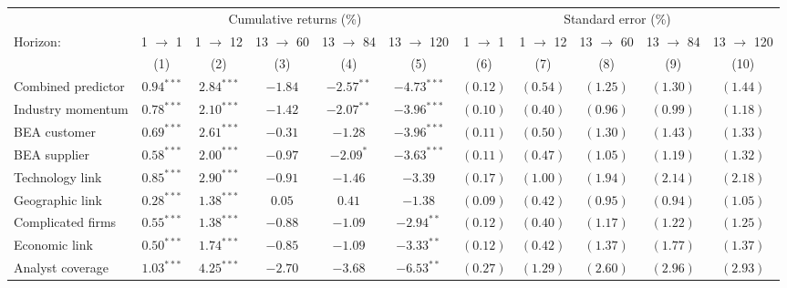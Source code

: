 \documentclass[
]{article}
\begin{document}
\begin{tabular}{lcccccccccc}
   \toprule & \multicolumn{5}{c}{Cumulative returns (\%)} & \multicolumn{5}{c}{Standard error (\%)} \\
 \cmidrule(l){2-6} \cmidrule(l){7-11}Horizon: & 1 $\rightarrow$ 1 & 1 $\rightarrow$ 12 & 13 $\rightarrow$ 60 & 13 $\rightarrow$ 84 & 13 $\rightarrow$ 120 & 1 $\rightarrow$ 1 & 1 $\rightarrow$ 12 & 13 $\rightarrow$ 60 & 13 $\rightarrow$ 84 & 13 $\rightarrow$ 120 \\ 
   \cmidrule(l){2-6} \cmidrule(l){7-11} \vspace{5pt} & (1) & (2) & (3) & (4) & (5) & (6) & (7) & (8) & (9) & (10) \\ 
   \vspace{5pt}Combined predictor & $0.94^{***}$ & $2.84^{***}$ & $-1.84$ & $-2.57^{**}$ & $-4.73^{***}$ & $(0.12)$ & $(0.54)$ & $(1.25)$ & $(1.30)$ & $(1.44)$ \\ 
  Industry momentum & $0.78^{***}$ & $2.10^{***}$ & $-1.42$ & $-2.07^{**}$ & $-3.96^{***}$ & $(0.10)$ & $(0.40)$ & $(0.96)$ & $(0.99)$ & $(1.18)$ \\ 
  BEA customer & $0.69^{***}$ & $2.61^{***}$ & $-0.31$ & $-1.28$ & $-3.96^{***}$ & $(0.11)$ & $(0.50)$ & $(1.30)$ & $(1.43)$ & $(1.33)$ \\ 
  BEA supplier & $0.58^{***}$ & $2.00^{***}$ & $-0.97$ & $-2.09^{*}$ & $-3.63^{***}$ & $(0.11)$ & $(0.47)$ & $(1.05)$ & $(1.19)$ & $(1.32)$ \\ 
  Technology link & $0.85^{***}$ & $2.90^{***}$ & $-0.91$ & $-1.46$ & $-3.39$ & $(0.17)$ & $(1.00)$ & $(1.94)$ & $(2.14)$ & $(2.18)$ \\ 
  Geographic link & $0.28^{***}$ & $1.38^{***}$ & $0.05$ & $0.41$ & $-1.38$ & $(0.09)$ & $(0.42)$ & $(0.95)$ & $(0.94)$ & $(1.05)$ \\ 
  Complicated firms & $0.55^{***}$ & $1.38^{***}$ & $-0.88$ & $-1.09$ & $-2.94^{**}$ & $(0.12)$ & $(0.40)$ & $(1.17)$ & $(1.22)$ & $(1.25)$ \\ 
  Economic link & $0.50^{***}$ & $1.74^{***}$ & $-0.85$ & $-1.09$ & $-3.33^{**}$ & $(0.12)$ & $(0.42)$ & $(1.37)$ & $(1.77)$ & $(1.37)$ \\ 
  Analyst coverage & $1.03^{***}$ & $4.25^{***}$ & $-2.70$ & $-3.68$ & $-6.53^{**}$ & $(0.27)$ & $(1.29)$ & $(2.60)$ & $(2.96)$ & $(2.93)$ \\ 
   \bottomrule 
\end{tabular}
\end{document}

